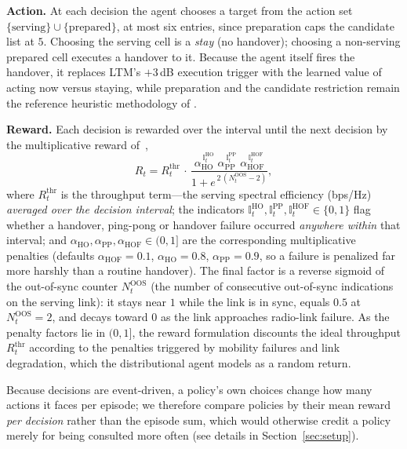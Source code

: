 \documentclass{ieeetmlcn}
\begin{document}
\textbf{Action.} At each decision the agent chooses a target from the action set
$\{\text{serving}\}\cup\{\text{prepared}\}$, at most six entries, since
preparation caps the candidate list at $5$. Choosing the serving cell is a
\emph{stay} (no handover); choosing a non-serving prepared cell executes a
handover to it. Because the agent itself fires the handover, it replaces LTM's
$+3$\,dB execution trigger with the learned value of acting now versus staying,
while preparation and the candidate restriction remain the reference heuristic methodology of \cite{eric2024}.

\textbf{Reward.} Each decision is rewarded over the interval until the next
decision by the multiplicative reward of~\cite{cmab_ho},
\begin{equation}
R_t = R^{\mathrm{thr}}_t \,\cdot\,
      \frac{\alpha_{\mathrm{HO}}^{\,\mathbb{I}^{\mathrm{HO}}_t}\;
            \alpha_{\mathrm{PP}}^{\,\mathbb{I}^{\mathrm{PP}}_t}\;
            \alpha_{\mathrm{HOF}}^{\,\mathbb{I}^{\mathrm{HOF}}_t}}
           {1 + e^{\,2\,(N^{\mathrm{OOS}}_t - 2)}},
\label{eq:reward}
\end{equation}
where $R^{\mathrm{thr}}_t$ is the throughput term---the serving spectral
efficiency (bps/Hz) \emph{averaged over the decision interval}; the indicators
$\mathbb{I}^{\mathrm{HO}}_t,\mathbb{I}^{\mathrm{PP}}_t,\mathbb{I}^{\mathrm{HOF}}_t\in\{0,1\}$
flag whether a handover, ping-pong or handover failure occurred \emph{anywhere
within} that interval; and
$\alpha_{\mathrm{HO}},\alpha_{\mathrm{PP}},\alpha_{\mathrm{HOF}}\in(0,1]$ are the
corresponding multiplicative penalties (defaults $\alpha_{\mathrm{HOF}}{=}0.1$,
$\alpha_{\mathrm{HO}}{=}0.8$, $\alpha_{\mathrm{PP}}{=}0.9$, so a failure is
penalized far more harshly than a routine handover). The final factor is a
reverse sigmoid of the out-of-sync counter $N^{\mathrm{OOS}}_t$ (the number of
consecutive out-of-sync indications on the serving link): it stays near $1$
while the link is in sync, equals $0.5$ at $N^{\mathrm{OOS}}_t{=}2$, and decays
toward $0$ as the link approaches radio-link failure.
As the penalty factors lie in $(0,1]$, the reward formulation discounts the ideal throughput $R^{\mathrm{thr}}_t$ according to the penalties triggered by mobility failures and link degradation, which the distributional agent models as a random
return.

Because decisions are event-driven, a policy's own choices change how many actions it
faces per episode; we therefore compare policies by their mean reward
\emph{per decision} rather than the episode sum, which would otherwise credit a
policy merely for being consulted more often (see details in Section~\ref{sec:setup}).
\end{document}
